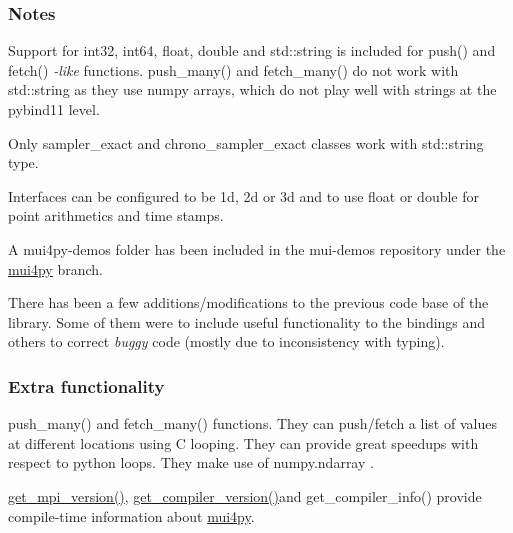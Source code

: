 \subsubsection*{Notes}


\begin{DoxyItemize}
\item Support for {\ttfamily int32}, {\ttfamily int64}, {\ttfamily float}, {\ttfamily double} and {\ttfamily std\+::string} is included for {\ttfamily push()} and {\ttfamily fetch()} {\itshape -\/like} functions. {\ttfamily push\+\_\+many()} and {\ttfamily fetch\+\_\+many()} do not work with {\ttfamily std\+::string} as they use {\ttfamily numpy} arrays, which do not play well with strings at the {\ttfamily pybind11} level.
\item Only {\ttfamily sampler\+\_\+exact} and {\ttfamily chrono\+\_\+sampler\+\_\+exact} classes work with {\ttfamily std\+::string} type.
\item Interfaces can be configured to be {\ttfamily 1d}, {\ttfamily 2d} or {\ttfamily 3d} and to use {\ttfamily float} or {\ttfamily double} for point arithmetics and time stamps.
\item A {\ttfamily mui4py-\/demos} folder has been included in the {\ttfamily mui-\/demos} repository under the {\ttfamily \hyperlink{namespacemui4py}{mui4py}} branch.
\item There has been a few additions/modifications to the previous code base of the library. Some of them were to include useful functionality to the bindings and others to correct {\itshape buggy} code (mostly due to inconsistency with typing).
\end{DoxyItemize}

\subsubsection*{Extra functionality}


\begin{DoxyItemize}
\item {\ttfamily push\+\_\+many()} and {\ttfamily fetch\+\_\+many()} functions. They can push/fetch a list of values at different locations using C looping. They can provide great speedups with respect to python loops. They make use of {\ttfamily numpy.\+ndarray} .
\item {\ttfamily \hyperlink{mui4py_8cpp_a4f5bdc6ba531d7e2906570602a6c5573}{get\+\_\+mpi\+\_\+version()}}, {\ttfamily \hyperlink{mui4py_8cpp_a2c6efd70ef12dc0a86693f6189af31f8}{get\+\_\+compiler\+\_\+version()}}and {\ttfamily get\+\_\+compiler\+\_\+info()} provide compile-\/time information about {\ttfamily \hyperlink{namespacemui4py}{mui4py}}.
\end{DoxyItemize}


